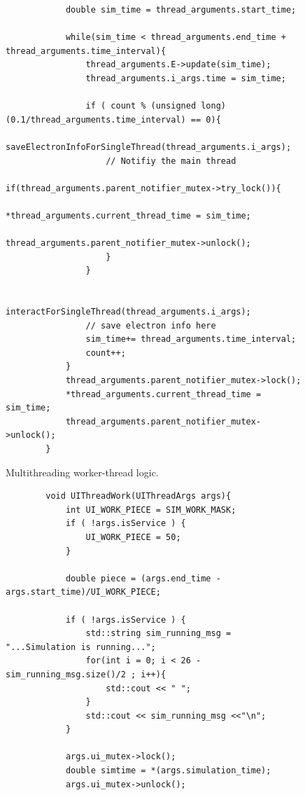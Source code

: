 \documentclass[a4paper,oneside,12pt]{report}
\numberwithin{equation}{chapter}
\begin{document}
{\begin{figure}[H]
\begin{verbatim}
            double sim_time = thread_arguments.start_time;
        
            while(sim_time < thread_arguments.end_time + thread_arguments.time_interval){
                thread_arguments.E->update(sim_time);
                thread_arguments.i_args.time = sim_time;
                
                if ( count % (unsigned long)(0.1/thread_arguments.time_interval) == 0){
                    saveElectronInfoForSingleThread(thread_arguments.i_args);
                    // Notifiy the main thread
                    if(thread_arguments.parent_notifier_mutex->try_lock()){
                        *thread_arguments.current_thread_time = sim_time;
                        thread_arguments.parent_notifier_mutex->unlock();
                    }
                }
        
                interactForSingleThread(thread_arguments.i_args);
                // save electron info here
                sim_time+= thread_arguments.time_interval;
                count++;
            }
            thread_arguments.parent_notifier_mutex->lock();
            *thread_arguments.current_thread_time = sim_time;
            thread_arguments.parent_notifier_mutex->unlock();
        }
    \end{verbatim}
    \vspace{0pt}
    \caption{Multithreading worker-thread logic.}
    \label{fig:threadLoop}
\end{figure}

\begin{figure}[H]
    \centering
    \begin{verbatim}
        void UIThreadWork(UIThreadArgs args){
            int UI_WORK_PIECE = SIM_WORK_MASK;
            if ( !args.isService ) {
                UI_WORK_PIECE = 50;
            }
        
            double piece = (args.end_time - args.start_time)/UI_WORK_PIECE;
        
            if ( !args.isService ) {
                std::string sim_running_msg = "...Simulation is running...";
                for(int i = 0; i < 26 - sim_running_msg.size()/2 ; i++){
                    std::cout << " ";
                }
                std::cout << sim_running_msg <<"\n";
            }
        
            args.ui_mutex->lock();
            double simtime = *(args.simulation_time);
            args.ui_mutex->unlock();
        

\end{verbatim}
\end{figure}}
\end{document}
